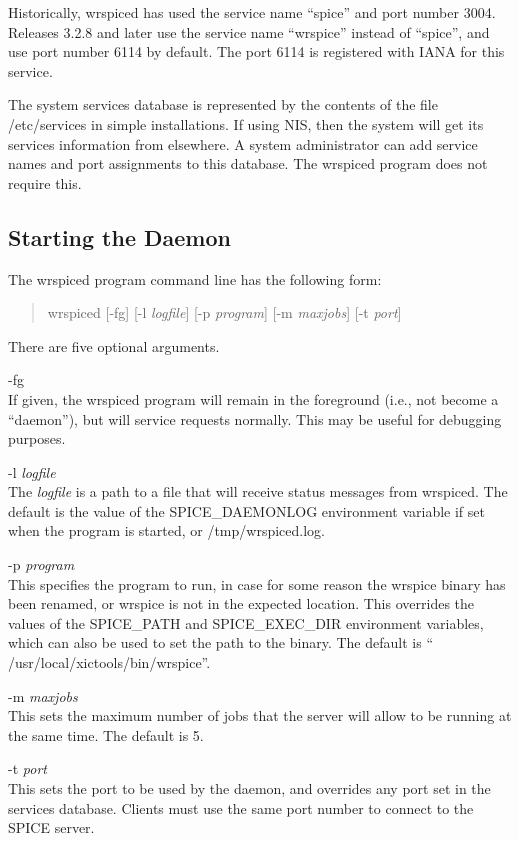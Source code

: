 Historically, {\vt wrspiced} has used the service name ``{\vt spice}''
and port number 3004.  Releases 3.2.8 and later use the service name
``{\vt wrspice}'' instead of ``{\vt spice}'', and use port number 6114
by default.  The port 6114 is registered with IANA for this service.

The system services database is represented by the contents of the
file {\vt /etc/services} in simple installations.  If using NIS, then
the system will get its services information from elsewhere.  A system
administrator can add service names and port assignments to this
database.  The {\vt wrspiced} program does not require this.

\subsection{Starting the Daemon}

The {\vt wrspiced} program command line has the following form:

\begin{quote}
{\vt wrspiced} [{\vt -fg}] [{\vt -l} {\it logfile\/}]
  [{\vt -p} {\it program\/}] [{\vt -m} {\it maxjobs\/}] [{\vt -t} {\it port\/}]
\end{quote}

There are five optional arguments.
\begin{description}
\item{\vt -fg}\\
If given, the {\vt wrspiced} program will remain in the foreground
(i.e., not become a ``daemon''), but will service requests normally. 
This may be useful for debugging purposes.

\item{{\vt -l} {\it logfile}}\\
The {\it logfile} is a path to a file that will receive status
messages from {\vt wrspiced}.  The default is the value of the {\et
SPICE\_DAEMONLOG} environment variable if set when the program is
started, or {\vt /tmp/wrspiced.log}.

\item{{\vt -p} {\it program}}\\
This specifies the {\WRspice} program to run, in case for some reason
the {\vt wrspice} binary has been renamed, or {\vt wrspice} is not in
the expected location.  This overrides the values of the {\et
SPICE\_PATH} and {\et SPICE\_EXEC\_DIR} environment variables, which
can also be used to set the path to the binary.  The default is ``{\vt
/usr/local/xictools/bin/wrspice}''.

\item{{\vt -m} {\it maxjobs}}\\
This sets the maximum number of jobs that the server will allow to be
running at the same time.  The default is 5.

\item{{\vt -t} {\it port}}\\
This sets the port to be used by the daemon, and overrides any port
set in the services database.  Clients must use the same port number
to connect to the SPICE server.
\end{description}

